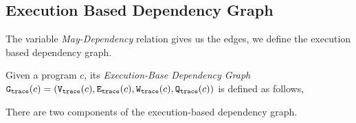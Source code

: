 \subsection{Execution Based Dependency Graph}
\label{sec:execution-base-graph-def}
%
%
%
%
The variable \emph{May-Dependency} relation gives us the edges, we define the execution based dependency graph.
\begin{defn}
\label{def:trace_graph}
Given a program ${c}$,
its \emph{Execution-Base Dependency Graph} 
$\mathtt{{G_{trace}}}({c}) = (\mathtt{{V_{trace}}}({c}), \mathtt{{E_{trace}}}({c}), \mathtt{{W_{trace}}}({c}), \mathtt{{Q_{trace}}}({c}))$ is defined as follows,
%
\highlight{\small
\[
\begin{array}{rlcl}
  \text{Vertices} &
  \traceV({c}) & := & 
  \{ 
  (x^l, w) 
  ~ \vert ~ 
  w : \mathcal{T} \to \mathbb{N}
  \land
  x^l \in \lvar(c) 
  \\ & & &
  \land
  \forall \trace \in \mathcal{T}_0(c), \trace' \in \mathcal{T} \st \config{{c}, \trace} \to^{*} \config{\eskip, \trace\tracecat\vtrace'} 
  \implies w(\trace) = \vcounter(\vtrace', l) 
\}
  \\
  \text{Edges} &
  \traceE({c}) & := & 
  \{ 
  (x^i, w, y^j) 
  ~ \vert ~
  x^i, y^j \in \lvar(c)
  \land w \in \mathcal{P}( \mathcal{T} \to \mathbb{N})
  \land 
  \exists \trace \in \mathcal{T}_0(c), 
  \trace_1, \trace_2 \in \mathcal{T} \st \dep(x^i, y^j,\trace_1, \trace_2, \trace_0, c)
  \\ & & &
  \forall \trace_0 \in \mathcal{T}_0(c) \st
  w (\trace_0) = \max\{|\sdiff(\trace_1, \trace_2, y)|
  \forall \trace_1, \trace_2 \in \mathcal{T} \st \dep(x^i, y^j,\trace_1, \trace_2, \trace_0, c) \}
  \}
\end{array}.
\]
}
\end{defn}
There are two components of the execution-based dependency graph. 
